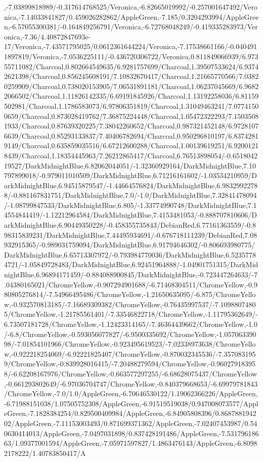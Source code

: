{\begin{tikzternal}
,-7.03899818989/-0.317614768525/Veronica,-6.82665019992/-0.257001647492/Veronica,-7.14033841827/0.459026282862/AppleGreen,-7.185/0.3204293994/AppleGreen,-6.57055300381/-0.164849256791/Veronica,-6.72768048249/-0.419335283973/Veronica,-7.36/4.40872847693e-17/Veronica,-7.43571795025/0.0612361644224/Veronica,-7.17538661166/-0.0404911897819/Veronica,-7.0536225111/-0.436720306722/Veronica,0.811849066939/6.97355711082/Charcoal,0.802664549635/6.9281757699/Charcoal,1.39507533624/6.93742621398/Charcoal,0.856245608191/7.10832670417/Charcoal,1.21665770566/7.03820259909/Charcoal,0.738020153905/7.06531891181/Charcoal,1.06237045669/6.96822066502/Charcoal,1.11826142335/6.69191845926/Charcoal,1.13192258036/6.81159502981/Charcoal,1.1786583073/6.97806351819/Charcoal,1.31049463241/7.07741500659/Charcoal,0.873028419762/7.36875224448/Charcoal,1.05472322293/7.15035081933/Charcoal,0.87639320225/7.38042260652/Charcoal,0.987321452148/6.97281076639/Charcoal,0.85293133837/7.40406782694/Charcoal,0.950296810197/6.83742819149/Charcoal,0.635859035516/6.67212600288/Charcoal,1.00139619251/6.92001218439/Charcoal,1.18354445963/7.26212865417/Charcoal,6.76513898054/-0.651804219527/DarkMidnightBlue,6.82062044051/-1.32360929164/DarkMidnightBlue,7.10797899018/-0.979011010509/DarkMidnightBlue,6.71216161602/-1.03534210959/DarkMidnightBlue,6.94515879547/-1.44664576824/DarkMidnightBlue,6.98329922788/-0.881167831751/DarkMidnightBlue,7.0/-1.0/DarkMidnightBlue,7.32841478094/-1.08799847533/DarkMidnightBlue,6.805/-1.33774990748/DarkMidnightBlue,7.14554844419/-1.12212964584/DarkMidnightBlue,7.4153481053/-0.888707810606/DarkMidnightBlue,6.90449350228/-0.458355735843/DebianRed,6.77161363559/-0.898315839231/DarkMidnightBlue,7.44495934691/-0.676718111239/DebianRed,7.08932915365/-0.989031759094/DarkMidnightBlue,6.91794646302/-0.806693980775/DarkMidnightBlue,6.65713307972/-0.793984770036/DarkMidnightBlue,6.52357784721/-1.05849728483/DarkMidnightBlue,6.92451964888/-1.04901751315/DarkMidnightBlue,6.96894171459/-0.884088900845/DarkMidnightBlue,-0.723447264633/-7.04380165021/ChromeYellow,-0.907294901688/-6.71468304511/ChromeYellow,-0.980805276814/-7.54966495486/ChromeYellow,-1.21650635095/-6.875/ChromeYellow,-0.932570813185/-7.16689309382/ChromeYellow,-0.76435997537/-7.10988074805/ChromeYellow,-1.21785561401/-7.33546822718/ChromeYellow,-1.11795362649/-6.73507181728/ChromeYellow,-1.12423314165/-7.46364439662/ChromeYellow,-1.0/-6.8/ChromeYellow,-0.593056077827/-6.9500335692/ChromeYellow,-1.05706339098/-7.01854101966/ChromeYellow,-0.923495619523/-7.02338973638/ChromeYellow,-0.922218254069/-6.92221825407/ChromeYellow,-0.870032345536/-7.3570831959/ChromeYellow,-0.839928016415/-7.20488279594/ChromeYellow,-0.960279183958/-6.62208167976/ChromeYellow,-0.663577297255/-6.68628075437/ChromeYellow,-0.661293802649/-6.97036704747/ChromeYellow,-0.840379668653/-6.69979781843/ChromeYellow,-7.0/1.0/AppleGreen,-6.70646530122/1.19062366226/AppleGreen,-6.71988151038/1.07505752308/AppleGreen,-6.91519519038/0.947008073577/AppleGreen,-7.1828384254/0.829500409984/AppleGreen,-6.84905808396/0.868788194202/AppleGreen,-7.11153003493/0.871699371362/AppleGreen,-7.02407453987/0.540630414013/AppleGreen,-7.0497031898/0.837428191486/AppleGreen,-7.53179618663/1.09377001594/AppleGreen,-7.05971597827/1.4863476143/AppleGreen,-6.80982178222/1.40783850417/A
\end{tikzternal}}
